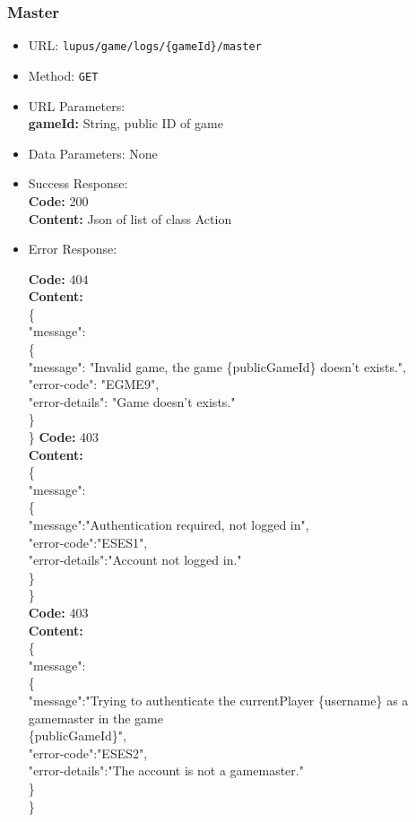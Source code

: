 \subsubsection*{Master}
\begin{itemize}
    \item URL: \texttt{lupus/game/logs/\{gameId\}/master}
    \item Method: \texttt{GET}
    \item URL Parameters:\\
        \textbf{gameId:} String, public ID of game
    \item Data Parameters: None
    \item Success Response: \\
        \textbf{Code:} 200\\
        \textbf{Content:} Json of list of class Action
    \item Error Response:
   
        \textbf{Code:} 404\\
        \textbf{Content:}\\
        \{\\
         \tab "message": \\
         \tab \{\\
         \tab \tab "message": "Invalid game, the game \{publicGameId\} doesn't exists.",\\
         \tab \tab "error-code": "EGME9",\\
         \tab \tab "error-details": "Game doesn't exists."\\
         \tab \}\\
        \}
        \textbf{Code:} 403\\
        \textbf{Content:}\\
        \{      \\ 
         \tab "message":\\
         \tab \{\\
         \tab \tab  "message":"Authentication required, not logged in",\\
         \tab \tab  "error-code":"ESES1",\\
         \tab \tab  "error-details":"Account not logged in."\\
         \tab \}\\
        \}\\
        \textbf{Code:} 403\\
        \textbf{Content:}\\
        \{\\
         \tab "message":\\
         \tab \{\\
         \tab \tab "message":"Trying to authenticate the currentPlayer \{username\} as a   gamemaster in the game \\
         \tab \tab\{publicGameId\}",\\
         \tab \tab "error-code":"ESES2",\\
         \tab \tab "error-details":"The account is not a gamemaster."\\
         \tab \}\\
        \}\\
\end{itemize}

